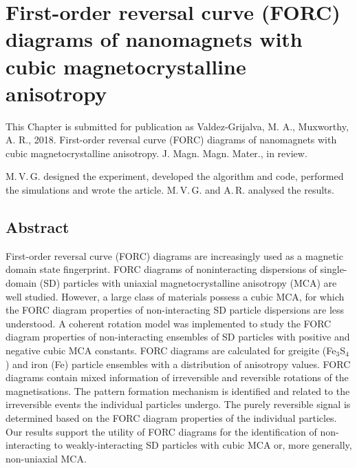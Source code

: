 \chapter{First-order reversal curve (FORC) diagrams of nanomagnets with cubic magnetocrystalline anisotropy}
\label{ch:res-2}
\fancyhead[C]{}
\fancyhead[R]{}
\fancyfoot[C]{\thepage}

This Chapter is submitted for publication as Valdez-Grijalva, M. A., Muxworthy, A. R., 2018. First-order reversal curve (FORC) diagrams of nanomagnets with cubic magnetocrystalline anisotropy. J. Magn. Magn. Mater., in review.\par

M.\,V.\,G. designed the experiment, developed the algorithm and code, performed the simulations and wrote the article. M.\,V.\,G. and A.\,R. analysed the results.\par

\section*{Abstract}
First-order reversal curve (FORC) diagrams are increasingly used as a magnetic domain state fingerprint. FORC diagrams of noninteracting dispersions of single-domain (SD) particles with uniaxial magnetocrystalline anisotropy (MCA) are well studied. However, a large class of materials possess a cubic MCA, for which the FORC diagram properties of non-interacting SD particle dispersions are less understood. A coherent rotation model was implemented to study the FORC diagram properties of non-interacting ensembles of SD particles with positive and negative cubic MCA constants. FORC diagrams are calculated for greigite (Fe$_3$S$_4$) and iron (Fe) particle ensembles with a distribution of anisotropy values. FORC diagrams contain mixed information of irreversible and reversible rotations of the magnetisations. The pattern formation mechanism is identified and related to the irreversible events the individual particles undergo. The purely reversible signal is determined based on the FORC diagram properties of the individual particles. Our results support the utility of FORC diagrams for the identification of non-interacting to weakly-interacting SD particles with cubic MCA or, more generally, non-uniaxial MCA.\par


